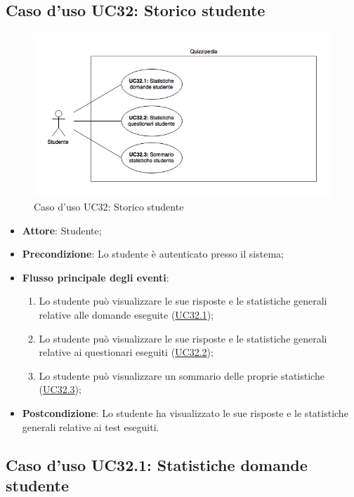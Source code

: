 \documentclass[12pt,a4paper]{article}
\begin{document}
\subsection{Caso d'uso UC32: Storico studente}
\begin{figure}[H]
	\centering
	\includegraphics[width=\textwidth]{../img/diagramUC32.png}
	\caption{Caso d'uso UC32: Storico studente}\label{fig:UC32} 
\end{figure}
\begin{itemize}

\item \textbf{Attore}: Studente; 
\item \textbf{Precondizione}: Lo studente è autenticato presso il sistema;

\item \textbf{Flusso principale degli eventi}:
\begin{enumerate}
	\item Lo studente può visualizzare le sue risposte e le statistiche generali relative alle domande eseguite (\hyperlink{UC32.1}{UC32.1});
	\item Lo studente può visualizzare le sue risposte e le statistiche generali relative ai questionari eseguiti (\hyperlink{UC32.2}{UC32.2});
	\item Lo studente può visualizzare un sommario delle proprie statistiche (\hyperlink{UC32.3}{UC32.3});
	
\end{enumerate}
\item \textbf{Postcondizione}: Lo studente ha visualizzato le sue risposte e le statistiche generali relative ai test eseguiti.
\end{itemize}
\hypertarget{UC32.1}{}
\subsection{Caso d'uso UC32.1: Statistiche domande studente}
\end{document}
